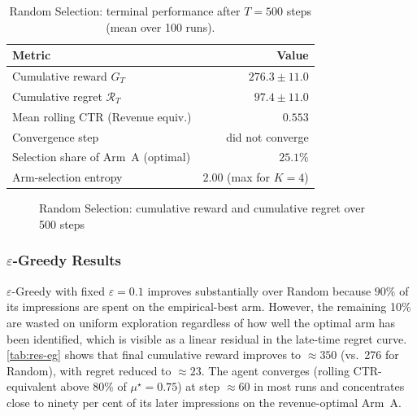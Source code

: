 \begin{table}[H]
\centering
\caption{Random Selection: terminal performance after $T = 500$ steps (mean over 100 runs).}
\label{tab:res-random}
\small
\begin{tabular}{lr}
\toprule
\textbf{Metric} & \textbf{Value}\\
\midrule
Cumulative reward $G_T$              & $276.3 \pm 11.0$\\
Cumulative regret $\mathcal{R}_T$    & $97.4 \pm 11.0$\\
Mean rolling CTR (Revenue equiv.)    & $0.553$\\
Convergence step                     & did not converge\\
Selection share of Arm~A (optimal)   & $25.1\%$\\
Arm-selection entropy                & $2.00$ (max for $K=4$)\\
\bottomrule
\end{tabular}
\end{table}

\begin{figure}[H]
\centering
{}
\caption{Random Selection: cumulative reward and cumulative regret over 500 steps}
\label{fig:rand-curves}
\end{figure}

\subsubsection{$\varepsilon$-Greedy Results}
$\varepsilon$-Greedy with fixed $\varepsilon = 0.1$ improves substantially over Random because $90\%$ of its impressions are spent on the empirical-best arm. However, the remaining 10\% are wasted on uniform exploration regardless of how well the optimal arm has been identified, which is visible as a linear residual in the late-time regret curve. \cref{tab:res-eg} shows that final cumulative reward improves to $\approx 350$ (vs.\ 276 for Random), with regret reduced to $\approx 23$. The agent converges (rolling CTR-equivalent above $80\%$ of $\mu^\star = 0.75$) at step $\approx 60$ in most runs and concentrates close to ninety per cent of its later impressions on the revenue-optimal Arm~A.

